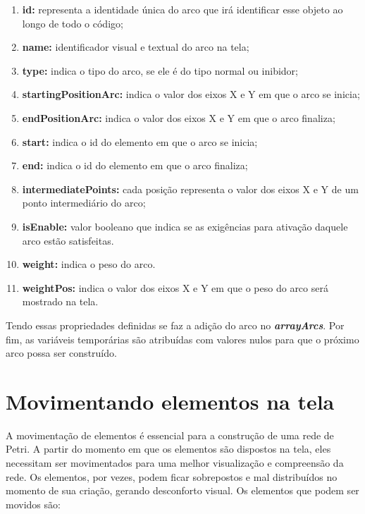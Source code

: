 \documentclass[
	12pt,				%
	openright,			%
	oneside,			%
	a4paper,			%
	english,			%
	brazil				%
	]{abntex2}
\begin{document}
\begin{enumerate}
	\item \textbf{id:} representa a identidade única do arco que irá identificar esse objeto ao longo de todo o código;
	\item \textbf{name:} identificador visual e textual do arco na tela;
	\item \textbf{type:} indica o tipo do arco, se ele é do tipo normal ou inibidor;
	\item \textbf{startingPositionArc:} indica o valor dos eixos X e Y em que o arco se inicia;
	\item \textbf{endPositionArc:} indica o valor dos eixos X e Y em que o arco finaliza;
	\item \textbf{start:} indica o id do elemento em que o arco se inicia;
	\item \textbf{end:} indica o id do elemento em que o arco finaliza;
	\item \textbf{intermediatePoints:} cada posição representa o valor dos eixos X e Y de um ponto intermediário do arco;
	\item \textbf{isEnable:} valor booleano que indica se as exigências para ativação daquele arco estão satisfeitas.
	\item \textbf{weight:} indica o peso do arco.
	\item \textbf{weightPos:} indica o valor dos eixos X e Y em que o peso do arco será mostrado na tela.
\end{enumerate}

Tendo essas propriedades definidas se faz a adição do arco no \textbf{\textit{arrayArcs}}. Por fim, as variáveis temporárias são atribuídas com valores nulos para que o próximo arco possa ser construído.



\section{Movimentando elementos na tela}\label{cap:move_elements}

A movimentação de elementos é essencial para a construção de uma rede de Petri. A partir do momento em que os elementos são dispostos na tela, eles necessitam ser movimentados para uma melhor visualização e compreensão da rede. Os elementos, por vezes, podem ficar sobrepostos e mal distribuídos no momento de sua criação, gerando desconforto visual. Os elementos que podem ser movidos são: 
\end{document}
